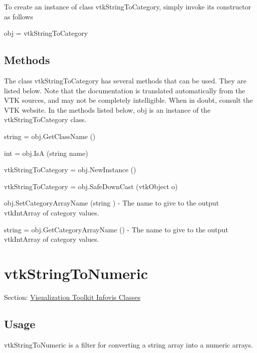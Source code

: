 To create an instance of class vtk\-String\-To\-Category, simply invoke its constructor as follows \begin{DoxyVerb}  obj = vtkStringToCategory
\end{DoxyVerb}
 \hypertarget{vtkwidgets_vtkxyplotwidget_Methods}{}\subsection{Methods}\label{vtkwidgets_vtkxyplotwidget_Methods}
The class vtk\-String\-To\-Category has several methods that can be used. They are listed below. Note that the documentation is translated automatically from the V\-T\-K sources, and may not be completely intelligible. When in doubt, consult the V\-T\-K website. In the methods listed below, {\ttfamily obj} is an instance of the vtk\-String\-To\-Category class. 
\begin{DoxyItemize}
\item {\ttfamily string = obj.\-Get\-Class\-Name ()}  
\item {\ttfamily int = obj.\-Is\-A (string name)}  
\item {\ttfamily vtk\-String\-To\-Category = obj.\-New\-Instance ()}  
\item {\ttfamily vtk\-String\-To\-Category = obj.\-Safe\-Down\-Cast (vtk\-Object o)}  
\item {\ttfamily obj.\-Set\-Category\-Array\-Name (string )} -\/ The name to give to the output vtk\-Int\-Array of category values.  
\item {\ttfamily string = obj.\-Get\-Category\-Array\-Name ()} -\/ The name to give to the output vtk\-Int\-Array of category values.  
\end{DoxyItemize}\hypertarget{vtkinfovis_vtkstringtonumeric}{}\section{vtk\-String\-To\-Numeric}\label{vtkinfovis_vtkstringtonumeric}
Section\-: \hyperlink{sec_vtkinfovis}{Visualization Toolkit Infovis Classes} \hypertarget{vtkwidgets_vtkxyplotwidget_Usage}{}\subsection{Usage}\label{vtkwidgets_vtkxyplotwidget_Usage}
vtk\-String\-To\-Numeric is a filter for converting a string array into a numeric arrays.

